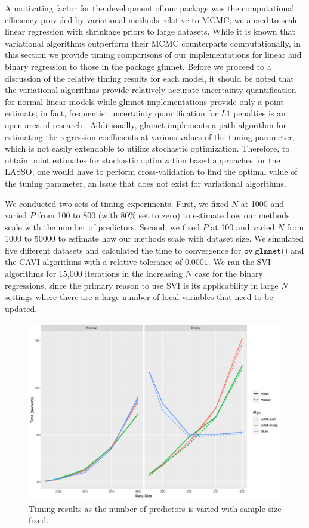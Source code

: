 \documentclass[]{article}
\let\code=\texttt
\newcommand{\fct}[1]{\code{#1()}}
\newcommand{\pkg}[1]{{\fontseries{b}\selectfont #1}}
\begin{document}
A motivating factor for the development of our package was the computational
efficiency provided by variational methods relative to MCMC; we aimed to scale
linear regression with shrinkage priors to large datasets.  While it is known
that variational algorithms outperform their MCMC counterparts computationally,
in this section we provide timing comparisons of our implementations for linear
and binary regression to those in the package \pkg{glmnet}. Before we proceed to
a discussion of the relative timing results for each model, it should be noted
that the variational algorithms provide relatively accurate uncertainty
quantification for normal linear models while \pkg{glmnet} implementations
provide only a point estimate; in fact, frequentist uncertainty quantification
for $L1$ penalties is an open area of research  \citep{kyung2010penalized}.
Additionally, \pkg{glmnet} implements a path algorithm for estimating the
regression coefficients at various values of the tuning parameter, which is not
easily extendable to utilize stochastic optimization. Therefore, to obtain point
estimates for stochastic optimization based approaches for the LASSO, one would
have to perform cross-validation to find the optimal value of the tuning
parameter, an issue that does not exist for variational algorithms. 

We conducted two sets of timing experiments. First, we fixed $N$ at 1000 and
varied $P$ from 100 to 800 (with 80\% set to zero) to estimate how our methods
scale with the number of predictors. Second, we fixed $P$ at 100 and varied $N$
from 1000 to 50000 to estimate how our methods scale with dataset size. We
simulated five different datasets and calculated the time to convergence for
$\fct{cv.glmnet}$ and the CAVI algorithms with a relative tolerance of $0.0001$.
We ran the SVI algorithms for 15,000 iterations in the increasing $N$ case for
the binary regressions, since the primary reason to use SVI is its applicability
in large $N$ settings where there are a large number of local variables that
need to be updated. 

\begin{figure}
	\centering
	\includegraphics[scale=0.5]{./timing_n_fix.pdf}
	\caption{Timing results as the number of predictors is varied with 
		sample size fixed.}	\label{fig:timing_n_fix}
\end{figure}
\end{document}
